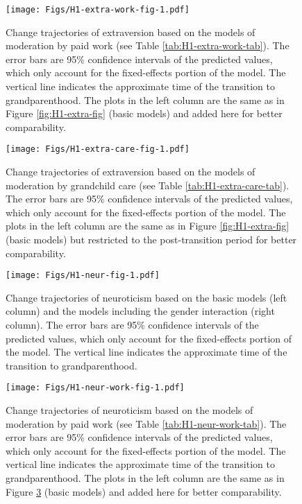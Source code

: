 \documentclass[
  english,
  man, noextraspace,floatsintext]{apa7}
\begin{document}
\begin{appendix}
\begin{figure}
\centering
\texttt{[image: Figs/H1-extra-work-fig-1.pdf]}
\caption{\label{fig:H1-extra-work-fig}Change trajectories of extraversion based on
the models of moderation by paid work (see Table
\ref{tab:H1-extra-work-tab}). The error bars are 95\% confidence
intervals of the predicted values, which only account for the
fixed-effects portion of the model. The vertical line indicates the
approximate time of the transition to grandparenthood. The plots in the
left column are the same as in Figure \ref{fig:H1-extra-fig} (basic
models) and added here for better comparability.}
\end{figure}









\begin{figure}
\centering
\texttt{[image: Figs/H1-extra-care-fig-1.pdf]}
\caption{\label{fig:H1-extra-care-fig}Change trajectories of extraversion based on
the models of moderation by grandchild care (see Table
\ref{tab:H1-extra-care-tab}). The error bars are 95\% confidence
intervals of the predicted values, which only account for the
fixed-effects portion of the model. The plots in the left column are the
same as in Figure \ref{fig:H1-extra-fig} (basic models) but restricted
to the post-transition period for better comparability.}
\end{figure}








\begin{figure}
\centering
\texttt{[image: Figs/H1-neur-fig-1.pdf]}
\caption{\label{fig:H1-neur-fig}Change trajectories of neuroticism based on the
basic models (left column) and the models including the gender
interaction (right column). The error bars are 95\% confidence intervals
of the predicted values, which only account for the fixed-effects
portion of the model. The vertical line indicates the approximate time
of the transition to grandparenthood.}
\end{figure}










\begin{figure}
\centering
\texttt{[image: Figs/H1-neur-work-fig-1.pdf]}
\caption{\label{fig:H1-neur-work-fig}Change trajectories of neuroticism based on
the models of moderation by paid work (see Table
\ref{tab:H1-neur-work-tab}). The error bars are 95\% confidence
intervals of the predicted values, which only account for the
fixed-effects portion of the model. The vertical line indicates the
approximate time of the transition to grandparenthood. The plots in the
left column are the same as in Figure \ref{fig:H1-neur-fig} (basic
models) and added here for better comparability.}
\end{figure}










\end{appendix}
\end{document}
